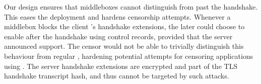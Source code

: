 Our design ensures that middleboxes cannot distinguish \tcpls from \tls past the
handshake. This eases the \tcpls deployment and hardens censorship attempts.
Whenever a middlebox blocks the client \tcpls's handshake extensions, the later
could choose to enable \tcpls after the handshake using \tcpls control records,
provided that the server announced \tcpls support.  The censor would not be able
to trivially distinguish this behaviour from regular \tls, hardening potential
attempts for censoring applications using \tcpls. The server handshake
extensions are encrypted and part of the TLS handshake transcript hash,  and thus
cannot be targeted by such attacks.









